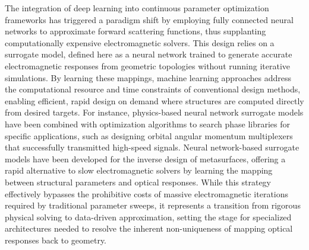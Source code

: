 The integration of deep learning into continuous parameter optimization frameworks has triggered a paradigm shift by employing fully connected neural networks to approximate forward scattering functions, thus supplanting computationally expensive electromagnetic solvers. This design relies on a surrogate model, defined here as a neural network trained to generate accurate electromagnetic responses from geometric topologies without running iterative simulations. \citep{doi_10_1109_jmmct_2025_3544270_6b4eb6dd} By learning these mappings, machine learning approaches address the computational resource and time constraints of conventional design methods, enabling efficient, rapid design on demand where structures are computed directly from desired targets. For instance, physics-based neural network surrogate models have been combined with optimization algorithms to search phase libraries for specific applications, such as designing orbital angular momentum multiplexers that successfully transmitted high-speed signals. Neural network-based surrogate models have been developed for the inverse design of metasurfaces, offering a rapid alternative to slow electromagnetic solvers by learning the mapping between structural parameters and optical responses. \citep{doi_10_1364_prj_450564_4b46735d} While this strategy effectively bypasses the prohibitive costs of massive electromagnetic iterations required by traditional parameter sweeps, it represents a transition from rigorous physical solving to data-driven approximation, setting the stage for specialized architectures needed to resolve the inherent non-uniqueness of mapping optical responses back to geometry. \citep{doi_10_71465_fapm546_bda368a5} \citep{doi_10_1364_prj_450564_4b46735d} \citep{doi_10_1088_1361_6463_ab8036_d433363a}

